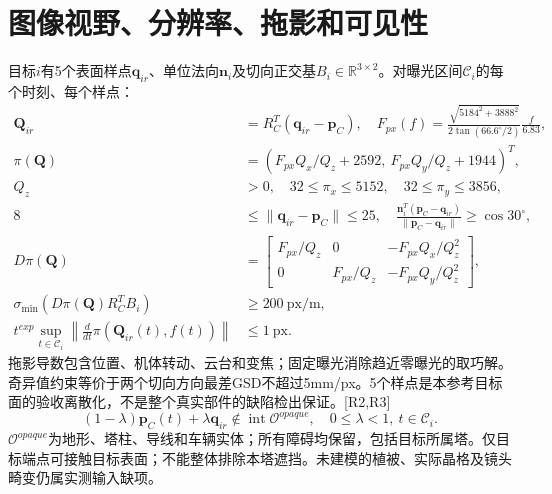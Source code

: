 \section{图像视野、分辨率、拖影和可见性}
\noindent 目标$i$有5个表面样点$\mathbf q_{ir}$、单位法向$\mathbf n_i$及切向正交基$B_i\in\mathbb R^{3\times2}$。对曝光区间$\mathcal C_i$的每个时刻、每个样点：
\begin{align}
 \mathbf Q_{ir}&=R_C^T(\mathbf q_{ir}-\mathbf p_C),\quad
 F_{px}(f)=\frac{\sqrt{5184^2+3888^2}}{2\tan(66.6^\circ/2)}\frac{f}{6.83},\\
 \pi(\mathbf Q)&=(F_{px}Q_x/Q_z+2592,\ F_{px}Q_y/Q_z+1944)^T,\\
 Q_z&>0,\quad 32\le\pi_x\le5152,\quad32\le\pi_y\le3856,\label{eng:eq:fov}\\
 8&\le\|\mathbf q_{ir}-\mathbf p_C\|\le25,\quad
 \frac{\mathbf n_i^T(\mathbf p_C-\mathbf q_{ir})}{\|\mathbf p_C-\mathbf q_{ir}\|}\ge\cos30^\circ,
 \label{eng:eq:viewangle}\\
 D\pi(\mathbf Q)&=\begin{bmatrix}F_{px}/Q_z&0&-F_{px}Q_x/Q_z^2\\
 0&F_{px}/Q_z&-F_{px}Q_y/Q_z^2\end{bmatrix},\\
 \sigma_{\min}\!\left(D\pi(\mathbf Q)R_C^TB_i\right)&\ge200\ \mathrm{px/m},
 \label{eng:eq:gsd}\\
 t^{exp}\sup_{t\in\mathcal C_i}\left\|\frac{d}{dt}\pi(\mathbf Q_{ir}(t),f(t))\right\|&\le1\ \mathrm{px}.
 \label{eng:eq:blur}
\end{align}
\noindent 拖影导数包含位置、机体转动、云台和变焦；固定曝光消除趋近零曝光的取巧解。奇异值约束等价于两个切向方向最差GSD不超过5mm/px。5个样点是本参考目标面的验收离散化，不是整个真实部件的缺陷检出保证。[R2,R3]
\begin{equation}
 (1-\lambda)\mathbf p_C(t)+\lambda\mathbf q_{ir}\notin\operatorname{int}\mathcal O^{opaque},
 \quad 0\le\lambda<1,\ t\in\mathcal C_i.
 \label{eng:eq:visibility}
\end{equation}
\noindent $\mathcal O^{opaque}$为地形、塔柱、导线和车辆实体；所有障碍均保留，包括目标所属塔。仅目标端点可接触目标表面；不能整体排除本塔遮挡。未建模的植被、实际晶格及镜头畸变仍属实测输入缺项。
\clearpage

